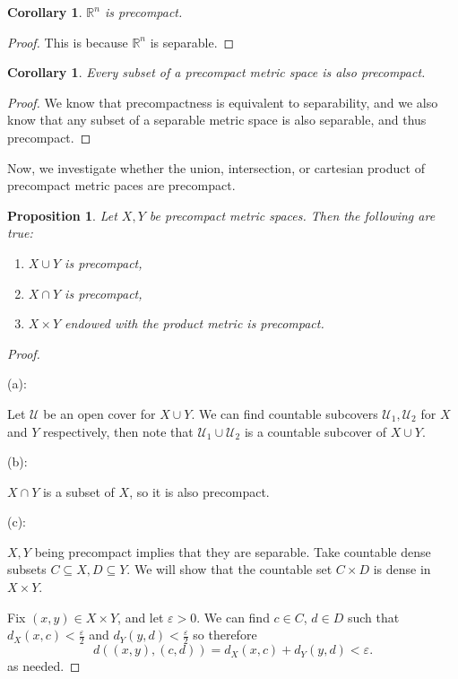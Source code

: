 \documentclass{article}
\theoremstyle{plain} %
\numberwithin{thm}{section} %
\newtheorem{prop}[thm]{Proposition}
\newtheorem{cor}[thm]{Corollary}
\theoremstyle{definition}
\begin{document}
    \begin{cor}
        \(\mathbb{R}^n\) is precompact.
    \end{cor}
    \begin{proof}
        This is because \(\mathbb{R}^n\) is separable.
    \end{proof}
    \begin{cor}
        Every subset of a precompact metric space is also precompact.
    \end{cor}
    \begin{proof}
        We know that precompactness is equivalent to separability, and we also know that any subset of a separable metric space is also separable, and thus precompact.
    \end{proof}
    Now, we investigate whether the union, intersection, or cartesian product of precompact metric paces are precompact.
    \begin{prop}
        Let \(X,Y\) be precompact metric spaces. Then the following are true:
        \begin{enumerate}[label=(\alph*)]
            \item \(X \cup Y\) is precompact,
            \item \(X \cap Y\) is precompact,
            \item \(X \times Y\) endowed with the product metric is precompact.
        \end{enumerate}
    \end{prop}
    \begin{proof}
        \ 

        (a):

        Let \(\mathcal{U}\) be an open cover for \(X \cup Y\). We can find countable subcovers \(\mathcal{U}_1, \mathcal{U}_2\) for \(X\) and \(Y\) respectively, then note that \(\mathcal{U} _1 \cup \mathcal{U} _2\) is a countable subcover of \(X \cup Y\).
        
        \medskip

        (b):

        \(X \cap Y\) is a subset of \(X\), so it is also precompact.

        \medskip

        (c):

        \(X,Y\) being precompact implies that they are separable. Take countable dense subsets \(C \subseteq X, D \subseteq Y\). We will show that the countable set \(C \times D\) is dense in \(X \times Y\).

        Fix \((x,y) \in X \times Y\), and let \(\varepsilon > 0\). We can find \(c \in C\), \(d \in D\) such that \(d_X(x,c) < \frac{\varepsilon}{2}\) and \(d_Y(y,d) < \frac{\varepsilon}{2}\) so therefore
        \[
            d((x,y), (c,d)) = d_X(x,c) + d_Y(y,d) < \varepsilon.
        \]
        as needed.
    \end{proof}
\end{document}
